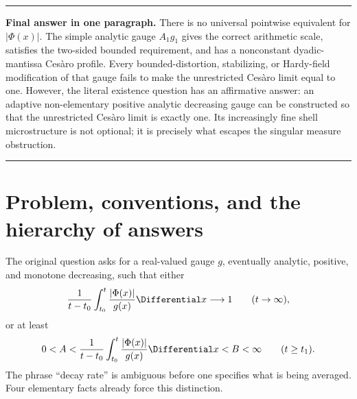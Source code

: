 \documentclass[11pt,oneside]{article}
\theoremstyle{definition}
\theoremstyle{remark}
\newenvironment{boxedremark}{%
  \par\smallskip\noindent\begin{center}\begin{minipage}{0.94\textwidth}%
  \color{black}\hrule\vspace{0.6em}\small
}{%
  \vspace{0.6em}\hrule\end{minipage}\end{center}\smallskip
}
\begin{document}
\begin{abstract}
We also give the complete exponent spectrum
\(\kappa_0=3.15149612947\ldots\) (typical),
\(\kappa_1=2.74807001487\ldots\) (arithmetic),
\(\kappa_2=\log_2(2\pi)=2.65149612947\ldots\) (RMS), and
\(\kappa_\infty=2.35901487911\ldots\) (uniform coarse envelope), prove the
sharp Lambert-\(W\) asymptotic for the largest peak in a dyadic annulus, and
rederive the central limit theorem and law of the iterated logarithm.  The exact
variance is \(\pi^2/4\), not \(\pi^2/2\); hence the published LIL constant in
the cited lacunary-product paper is too large by \(\sqrt2\).
\end{abstract}

\begin{boxedremark}
\textbf{Final answer in one paragraph.}
There is no universal pointwise equivalent for \(|\Phi(x)|\).  The simple
analytic gauge \(A_1g_1\) gives the correct arithmetic scale, satisfies the
two-sided bounded requirement, and has a nonconstant dyadic-mantissa Ces\`aro
profile.  Every bounded-distortion, stabilizing, or Hardy-field modification of
that gauge fails to make the unrestricted Ces\`aro limit equal to one.  However,
the literal existence question has an affirmative answer: an adaptive
non-elementary positive analytic decreasing gauge can be constructed so that
the unrestricted Ces\`aro limit is exactly one.  Its increasingly fine shell
microstructure is not optional; it is precisely what escapes the singular
measure obstruction.
\end{boxedremark}

\tableofcontents
\newpage

\section{Problem, conventions, and the hierarchy of answers}
\label{sec:introduction}

The original question asks for a real-valued gauge \(g\), eventually analytic,
positive, and monotone decreasing, such that either
\begin{equation}
 \frac1{t-t_0}\int_{t_0}^t\frac{|\Phi(x)|}{g(x)}\Differential x\longrightarrow1
 \qquad(t\to\infty),
 \label{eq:Q2}
\end{equation}
or at least
\begin{equation}
 0<A<\frac1{t-t_0}\int_{t_0}^t\frac{|\Phi(x)|}{g(x)}\Differential x<B<\infty
 \qquad(t\ge t_1).
 \label{eq:Q3}
\end{equation}
The phrase ``decay rate'' is ambiguous before one specifies what is being
averaged.  Four elementary facts already force this distinction.
\end{document}
